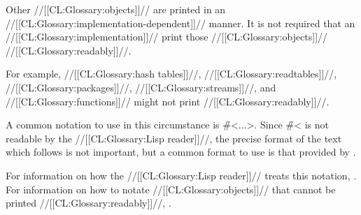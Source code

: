 \endsubsubsection%

Other //[[CL:Glossary:objects]]// are printed in an //[[CL:Glossary:implementation-dependent]]// manner. It is not required that an //[[CL:Glossary:implementation]]// print those //[[CL:Glossary:objects]]// //[[CL:Glossary:readably]]//.

For example, //[[CL:Glossary:hash tables]]//,  	     //[[CL:Glossary:readtables]]//,
             //[[CL:Glossary:packages]]//,
             //[[CL:Glossary:streams]]//,
         and //[[CL:Glossary:functions]]// might not print //[[CL:Glossary:readably]]//.

A common notation to use in this circumstance is \f{\#<...>}. Since \f{\#<} is not readable by the //[[CL:Glossary:Lisp reader]]//, the precise format of the text which follows is not important, but a common format to use is that provided by .

For information on how the //[[CL:Glossary:Lisp reader]]// treats this notation, \seesection\SharpsignLeftAngle. For information on how to notate //[[CL:Glossary:objects]]// that cannot be printed //[[CL:Glossary:readably]]//, \seesection\SharpsignDot.

\endsubsubsection%

\endsubsection%


